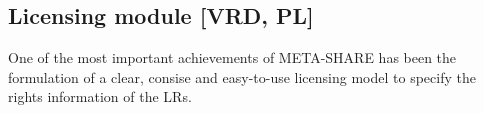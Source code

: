 \documentclass{llncs}
\begin{document}
{\subsection{Licensing module [VRD, PL]}
\label{sec:licensing}
One of the most important achievements of META-SHARE has been the formulation of a clear, consise and easy-to-use licensing model to specify the rights information of the LRs. 


}
\end{document}
